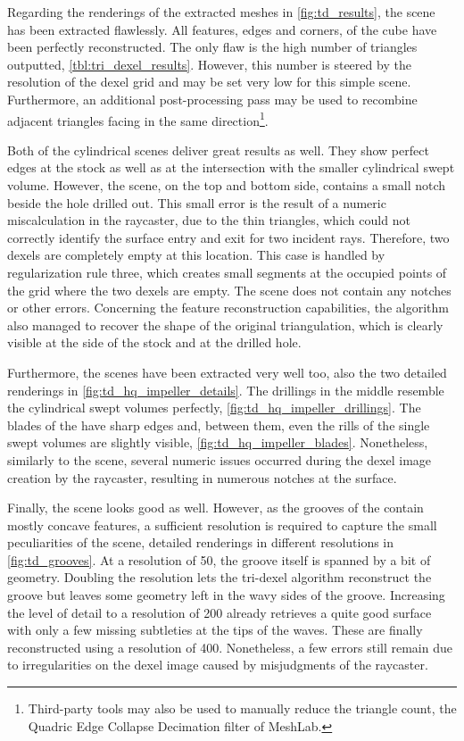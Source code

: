 Regarding the renderings of the extracted meshes in \cref{fig:td_results}, the \cubes scene has been extracted flawlessly.
All features, \ie edges and corners, of the cube have been perfectly reconstructed.
The only flaw is the high number of triangles outputted, \cf \cref{tbl:tri_dexel_results}. %
However, this number is steered by the resolution of the dexel grid and may be set very low for this simple scene.
Furthermore, an additional post-processing pass may be used to recombine adjacent triangles facing in the same direction\footnote{Third-party tools may also be used to manually reduce the triangle count, \eg the Quadric Edge Collapse Decimation filter of MeshLab.}.

Both of the cylindrical scenes deliver great results as well.
They show perfect edges at the stock as well as at the intersection with the smaller cylindrical swept volume.
However, the \cylinders scene, on the top and bottom side, contains a small notch beside the hole drilled out.
This small error is the result of a numeric miscalculation in the raycaster, due to the thin triangles, which could not correctly identify the surface entry and exit for two incident rays.
Therefore, two dexels are completely empty at this location.
This case is handled by regularization rule three, which creates small segments at the occupied points of the grid where the two dexels are empty.
The \cylindersd scene does not contain any notches or other errors.
Concerning the feature reconstruction capabilities, the algorithm also managed to recover the shape of the original triangulation, which is clearly visible at the side of the stock and at the drilled hole.

Furthermore, the \impeller scenes have been extracted very well too, \cf also the two detailed renderings in \cref{fig:td_hq_impeller_details}.
The drillings in the middle resemble the cylindrical swept volumes perfectly, \cf \cref{fig:td_hq_impeller_drillings}.
The blades of the \impeller have sharp edges and, between them, even the rills of the single swept volumes are slightly visible, \cf \cref{fig:td_hq_impeller_blades}.
Nonetheless, similarly to the \cylinders scene, several numeric issues occurred during the dexel image creation by the raycaster, resulting in numerous notches at the surface.

Finally, the \turbine scene looks good as well.
However, as the grooves of the \turbine contain mostly concave features, a sufficient resolution is required to capture the small peculiarities of the scene, \cf detailed renderings in different resolutions in \cref{fig:td_grooves}.
At a resolution of 50, the groove itself is spanned by a bit of geometry.
Doubling the resolution lets the tri-dexel algorithm reconstruct the groove but leaves some geometry left in the wavy sides of the groove.
Increasing the level of detail to a resolution of 200 already retrieves a quite good surface with only a few missing subtleties at the tips of the waves.
These are finally reconstructed using a resolution of 400.
Nonetheless, a few errors still remain due to irregularities on the dexel image caused by misjudgments of the raycaster.


